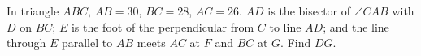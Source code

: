 In triangle $ABC$, $AB=30$, $BC=28$, $AC=26$. $AD$ is the bisector of $\angle CAB$ with $D$ on $BC$; $E$ is the foot of the perpendicular from $C$ to line $AD$; and the line through $E$ parallel to $AB$ meets $AC$ at $F$ and $BC$ at $G$. Find $DG$.
